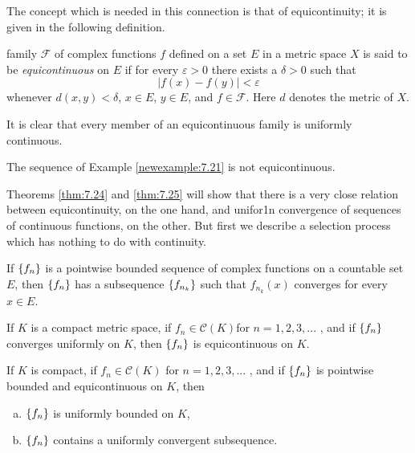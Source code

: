 The concept which is needed in this connection is that of equicontinuity;
it is given in the following definition.

\begin{mydef}
    \label{mydef:7.22}
    family $\mathscr{F}$ of complex functions $f$ defined on a set $E$ in a
    metric space $X$ is said to be \emph{equicontinuous} on $E$
    if for every $\varepsilon > 0$ there exists a $\delta > 0$ such that
    \begin{equation*}
        \left| f(x) - f(y) \right| < \varepsilon
    \end{equation*}
    whenever $d(x, y) < \delta$, $x \in E$, $y \in E$, and $f \in \mathscr{F}$. Here $d$ denotes the metric of $X$.

    It is clear that every member of an equicontinuous family is uniformly
    continuous.
\end{mydef}

The sequence of Example \ref{newexample:7.21} is not equicontinuous.

Theorems \ref{thm:7.24} and \ref{thm:7.25} will show that there is a very close relation between equicontinuity, on the one hand,
and unifor1n convergence of sequences of continuous functions, on the other.
But first we describe a selection process which has nothing to do with continuity.

\begin{thm}
    \label{thm:7.23}
    If $\protect\{f_n\}$ is a pointwise bounded sequence of complex functions on a countable set $E$,
    then $\protect\{f_n\}$ has a subsequence $\protect\{f_{n_k}\}$ such that ${f_{n_k}(x)}$ converges for every $x \in E$.
\end{thm}


\begin{thm}
    \label{thm:7.24}
    If $K$ is a compact metric space,
    if $f_n \in  \mathscr{C}(K)$for $n = 1, 2, 3, ...$ ,
    and if $\protect\{f_n\}$ converges uniformly on $K$,
    then $\protect\{f_n\}$ is equicontinuous on $K$.
\end{thm}



\begin{thm}
    \label{thm:7.25}
    If $K$ is compact,
    if $f_n \in \mathscr{C}(K)$ for $n = 1, 2, 3, ...$ ,
    and if $\protect\{f_n\}$ is pointwise bounded and equicontinuous on $K$, then
    \begin{enumerate}[(a)]
        \item $\protect\{f_n\}$ is uniformly bounded on $K$,
        \item $\protect\{f_n\}$ contains a uniformly convergent subsequence.
    \end{enumerate}
\end{thm}



